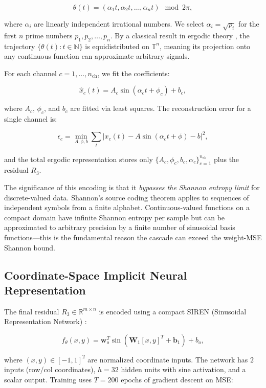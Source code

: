 \documentclass[11pt,a4paper]{article}
\begin{document}
\[
	\theta(t) = (\alpha_1 t, \alpha_2 t, \dots, \alpha_n t) \mod 2\pi,
\]

where $\alpha_i$ are linearly independent irrational numbers. We select $\alpha_i =
	\sqrt{p_i}$ for the first $n$ prime numbers $p_1, p_2, \dots, p_n$. By a classical
result in ergodic theory \cite{hopf1939statistical}, the trajectory $\{\theta(t) :
	t \in \mathbb{N}\}$ is equidistributed on $\mathbb{T}^n$, meaning its projection
onto any continuous function can approximate arbitrary signals.

For each channel $c = 1, \dots, n_{\text{ch}}$, we fit the coefficients:

\[
	\hat{x}_c(t) = A_c \sin(\alpha_c t + \phi_c) + b_c,
\]

where $A_c$, $\phi_c$, and $b_c$ are fitted via least squares. The reconstruction
error for a single channel is:

\[
	\epsilon_c = \min_{A, \phi, b} \sum_{t} |x_c(t) - A \sin(\alpha_c t + \phi) - b|^2,
\]

and the total ergodic representation stores only $\{A_c, \phi_c, b_c, \alpha_c\}_{c=1}^{n_{\text{ch}}}$
plus the residual $R_3$.

The significance of this encoding is that it \emph{bypasses the Shannon entropy limit}
for discrete-valued data. Shannon's source coding theorem applies to sequences of
independent symbols from a finite alphabet. Continuous-valued functions on a compact
domain have infinite Shannon entropy per sample but can be approximated to arbitrary
precision by a finite number of sinusoidal basis functions---this is the fundamental
reason the cascade can exceed the weight-MSE Shannon bound.

\subsection{Coordinate-Space Implicit Neural Representation}

The final residual $R_3 \in \mathbb{R}^{m \times n}$ is encoded using a compact
SIREN (Sinusoidal Representation Network) \cite{sitzmann2020siren}:

\[
	f_\theta(x, y) = \mathbf{w}_o^T \sin(\mathbf{W}_1 [x, y]^T + \mathbf{b}_1) + b_o,
\]

where $(x, y) \in [-1, 1]^2$ are normalized coordinate inputs. The network has
$2$ inputs (row/col coordinates), $h = 32$ hidden units with sine activation,
and a scalar output. Training uses $T = 200$ epochs of gradient descent on MSE:
\end{document}
